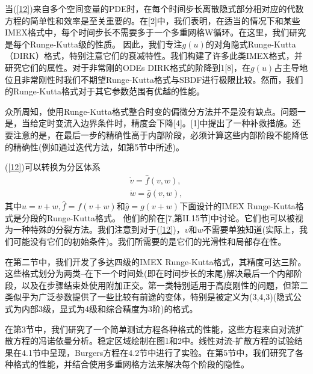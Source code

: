 \documentclass[12pt,a4paper]{article}
\numberwithin{equation}{section}
\begin{document}
当(\ref{12})来自多个空间变量的PDE时，在每个时间步长离散隐式部分相对应的代数方程的简单性和效率是至关重要的。在[2]中，我们表明，在适当的情况下和某些IMEX格式中，每个时间步长不需要多于一个多重网格W循环。在这里，我们研究是每个Runge-Kutta级的性质。 因此，我们专注$g(u)$的对角隐式Runge-Kutta（DIRK）格式，特别注意它们的衰减特性。我们构建了许多此类IMEX格式，并研究它们的属性。对于非常刚的ODEs DIRK格式的阶降到1[8]，在$g(u)$占主导地位且非常刚性时我们不期望Runge-Kutta格式与SBDF进行极限比较。然而，我们的Runge-Kutta格式对于其它参数范围有优越的性能。

众所周知，使用Runge-Kutta格式整合时变的偏微分方法并不是没有缺点。问题一是，当给定时变流入边界条件时，精度会下降[4]。[1]中提出了一种补救措施。还要注意的是，在最后一步的精确性高于内部阶段，必须计算这些内部阶段不能降低的精确性(例如通过迭代方法，如第5节中所述)。

(\ref{12})可以转换为分区体系
\begin{gather*}
\dot{v}=\widehat{f}(v,w),
\label{131} \\
\dot{w}=\widehat{g}(v,w),
\label{132}
\end{gather*}
其中$u=v+w,\widehat{f}=f(v+w)$和$\widehat{g}=g(v+w)$下面设计的IMEX Runge-Kutta格式是分段的Runge-Kutta格式。 他们的阶在[7,第II.15节]中讨论。它们也可以被视为一种特殊的分裂方法。我们注意到对于(\ref{12})，$v$和$w$不需要单独知道(实际上，我们可能没有它们的初始条件)。我们所需要的是它们的光滑性和局部存在性。

在第二节中，我们开发了多达四级的IMEX Runge-Kutta格式，其精度可达三阶。这些格式划分为两类--在下一个时间处(即在时间步长的末尾)解决最后一个内部阶段，以及在步骤结束处使用附加正交。第一类特别适用于高度刚性的问题，但第二类似乎为广泛参数提供了一些比较有前途的变体，特别是被定义为(3,4,3)(隐式公式为内部3级，显式为4级和综合精度为3阶)的格式。

在第3节中，我们研究了一个简单测试方程各种格式的性能，这些方程来自对流扩散方程的冯诺依曼分析。稳定区域绘制在图1和2中。线性对流-扩散方程的试验结果在4.1节中呈现，Burgers方程在4.2节中进行了实验。在第5节中，我们研究了各种格式的性能，并结合使用多重网格方法来解决每个阶段的隐性。
\end{document}
